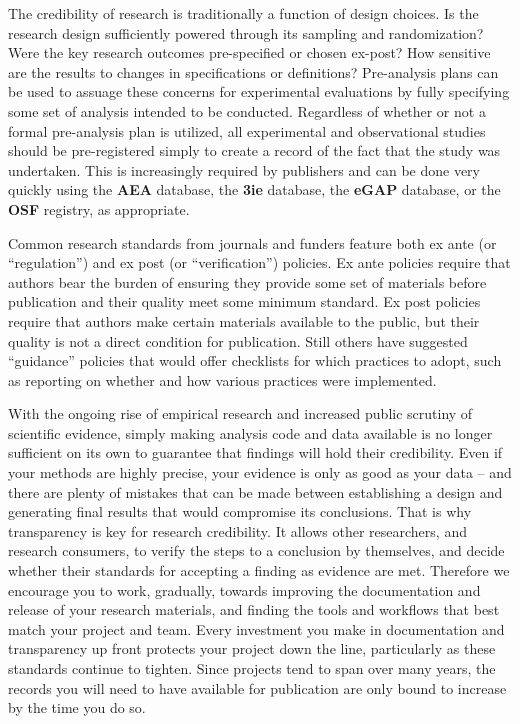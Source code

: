 The credibility of research is traditionally a function of design choices.\cite{angrist2010credibility,ioannidis2005most}
Is the research design sufficiently powered through its sampling and randomization?
Were the key research outcomes pre-specified or chosen ex-post?
How sensitive are the results to changes in specifications or definitions?
Pre-analysis plans can be used to assuage these concerns for experimental evaluations
by fully specifying some set of analysis intended to be conducted.
Regardless of whether or not a formal pre-analysis plan is utilized,
all experimental and observational studies should be pre-registered
simply to create a record of the fact that the study was undertaken.
This is increasingly required by publishers and can be done very quickly
using the \textbf{AEA} database,
the \textbf{3ie} database,
the \textbf{eGAP} database,
or the \textbf{OSF} registry, as appropriate.

Common research standards from journals and funders feature both ex ante
(or ``regulation'') and ex post (or ``verification'') policies.\cite{stodden2013toward}
Ex ante policies require that authors bear the burden
of ensuring they provide some set of materials before publication
and their quality meet some minimum standard.
Ex post policies require that authors make certain materials available to the public,
but their quality is not a direct condition for publication.
Still others have suggested ``guidance'' policies that would offer checklists
for which practices to adopt, such as reporting on whether and how
various practices were implemented.\cite{nosek2015promoting}

With the ongoing rise of empirical research and increased public scrutiny of scientific evidence,
simply making analysis code and data available
is no longer sufficient on its own to guarantee that findings will hold their credibility.
Even if your methods are highly precise,
your evidence is only as good as your data --
and there are plenty of mistakes that can be made between
establishing a design and generating final results that would compromise its conclusions.
That is why transparency is key for research credibility.
It allows other researchers, and research consumers,
to verify the steps to a conclusion by themselves,
and decide whether their standards for accepting a finding as evidence are met.
Therefore we encourage you to work, gradually, towards improving
the documentation and release of your research materials,
and finding the tools and workflows that best match your project and team.
Every investment you make in documentation and transparency up front
protects your project down the line, particularly as these standards continue to tighten.
Since projects tend to span over many years,
the records you will need to have available for publication are
only bound to increase by the time you do so.


